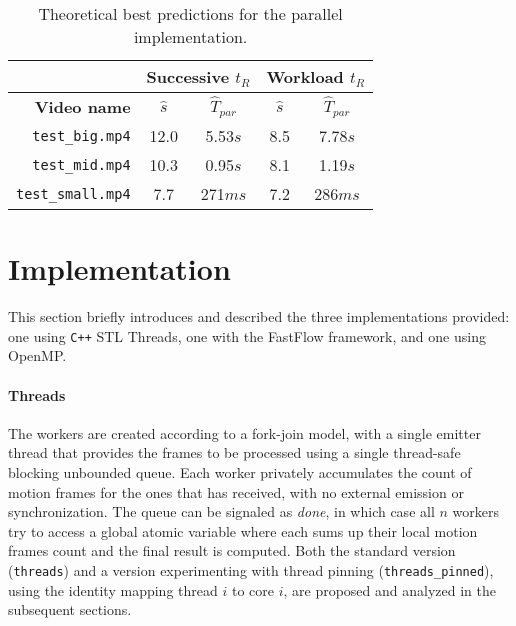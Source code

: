 \documentclass{article}
\begin{document}
\begin{table}[H]
\centering
\begin{tabular}{r||c|c|c|c}
\hline
                 & \multicolumn{2}{c|}{\textbf{Successive $t_R$}} & \multicolumn{2}{c}{\textbf{Workload $t_R$}}\\\hline
\textbf{Video name}              & $\widehat s$ & $\widehat T_{par}$         & $\widehat s$   & $\widehat T_{par}$\\\hline
\texttt{test\_big.mp4}   & 12.0         & 5.53$s$                  & 8.5            & 7.78$s$\\
\texttt{test\_mid.mp4}   & 10.3         & 0.95$s$                  & 8.1           & 1.19$s$\\
\texttt{test\_small.mp4} & 7.7          & 271$ms$               & 7.2            & 286$ms$\\
\hline
  \end{tabular}
\caption{Theoretical best predictions for the parallel implementation.}
\label{tbl:predictions}
\end{table}

\section{Implementation}

This section briefly introduces and described the three implementations provided: one using \texttt{C++} STL \textsf{Threads}, one with the \textsf{FastFlow} framework, and one using \textsf{OpenMP}.

\paragraph{\textsf{Threads}} The workers are created according to a fork-join model, with a single emitter thread that provides the frames to be processed using a single thread-safe blocking unbounded queue. Each worker privately accumulates the count of motion frames for the ones that has received, with no external emission or synchronization. The queue can be signaled as \emph{done}, in which case all $n$ workers try to access a global atomic variable where each sums up their local motion frames count and the final result is computed. Both the standard version (\texttt{threads}) and a version experimenting with thread pinning  (\texttt{threads\_pinned}), using the identity mapping thread $i$ to core $i$, are proposed and analyzed in the subsequent sections.
\end{document}

